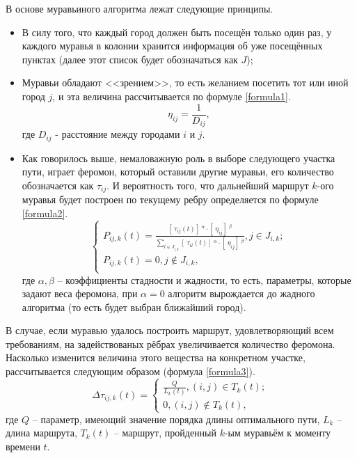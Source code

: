В основе муравьиного алгоритма лежат следующие принципы.
\begin{itemize}
	\item В силу того, что каждый город должен быть посещён только один раз, у каждого муравья в колонии хранится информация об уже посещённых пунктах (далее этот список будет обозначаться как $J$);
	
	\item Муравьи обладают <<зрением>>, то есть желанием посетить тот или иной город $j$, и эта величина рассчитывается по формуле \ref{formula1}.
	\begin{equation}\label{formula1}
			\eta_{ij} = \frac{1}{D_{ij}},
		\end{equation}
	где $D_{ij}$ - расстояние между городами $i$ и $j$.
	
	\item Как говорилось выше, немаловажную роль в выборе следующего участка пути, играет феромон, который оставили другие муравьи, его количество обозначается как $\tau_{ij}$. И вероятность того, что дальнейший маршрут $k$-ого муравья будет построен по текущему ребру определяется по формуле \ref{formula2}.
	\begin{equation}\label{formula2}
		\left\{
			\begin{array}{ccc}
				P_{ij, k}(t) = \frac{[\ \tau_{ij}(t)]\ ^\alpha \cdot [\ \eta_{ij} ]\ ^\beta}{ \sum\limits_{l \in J_{i, k}} [\ \tau_{il}(t) ]\ ^\alpha \cdot [\ \eta_{ij} ]\ ^\beta}, j \in J_{i, k};\\
				P_{ij, k}(t) = 0, j \notin J_{i, k}, \\
			\end{array}
		\right.
	\end{equation}
	где $\alpha, \beta$ -- коэффициенты стадности и жадности, то есть, параметры, которые задают веса феромона, при $\alpha = 0$ алгоритм вырождается до жадного алгоритма (то есть будет выбран ближайший город).
	\end{itemize}

В случае, если муравью удалось построить маршрут, удовлетворяющий всем требованиям, на задействованых рёбрах увеличивается количество феромона. Насколько изменится величина этого вещества на конкретном участке, рассчитывается следующим образом (формула \ref{formula3}).
\begin{equation}\label{formula3}
		\Delta \tau_{ij, k}(t) = \left\{
			\begin{array}{ccc}
				\frac{Q}{L_{k}(t)}, (i, j) \in T_{k}(t); \\
				0, (i, j) \notin T_{k}(t),
			\end{array}
		\right.
\end{equation}
где $Q$ -- параметр, имеющий значение порядка длины оптимального пути, $L_k$ -- длина маршрута, $T_k(t)$ -- маршрут, пройденный $k$-ым муравьём к моменту времени $t$.\\

